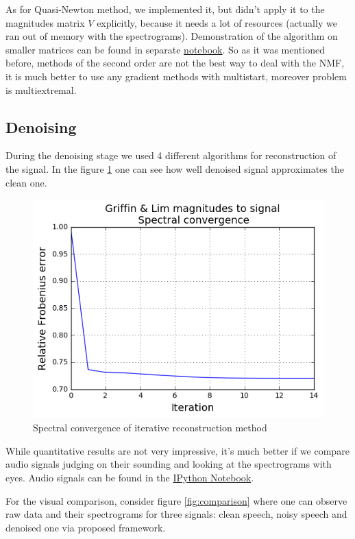 \documentclass[11pt]{article}
\makeatletter
\def\maxwidth{\ifdim\Gin@nat@width>\linewidth\linewidth
    \else\Gin@nat@width\fi}
\makeatother
\begin{document}
As for Quasi-Newton method, we implemented it, but didn’t apply it to the magnitudes matrix $V$ explicitly, because it needs a lot of resources (actually we ran out of memory with the spectrograms). Demonstration of the algorithm on smaller matrices can be found in separate \href{https://github.com/elejke/CNMF-ASR/blob/master/code/Quasi_Newton_Demo.ipynb}{notebook}. So as it was mentioned before, methods of the second order are not the best way to deal with the NMF, it is much better to use any gradient methods with multistart, moreover problem is multiextremal.

\subsection{Denoising}

During the denoising stage we used 4 different algorithms for reconstruction of the signal. In the figure \ref{fig:iterative} one can see how well denoised signal approximates the clean one.
\begin{figure}[H]
\centering
\includegraphics[width=0.5\maxwidth]{griffin&lim.png}
\caption{Spectral convergence of iterative reconstruction method}
\label{fig:iterative}
\end{figure}
While quantitative results are not very impressive, it's much better if we compare audio signals judging on their sounding and looking at the spectrograms with eyes. Audio signals can be found in the \href{https://github.com/elejke/CNMF-ASR/blob/master/code/Denoising_Demo.ipynb}{IPython Notebook}.

For the visual comparison, consider figure \ref{fig:comparison} where one can observe raw data and their spectrograms for three signals: clean speech, noisy speech and denoised one via proposed framework.
\end{document}
